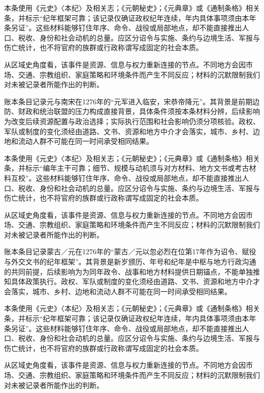 本条使用《元史》〈本纪〉及相关志；《元朝秘史》；《元典章》或《通制条格》相关条，并标示“纪年框架可靠；该记录仅确证政权纪年连续，年内具体事项须由本年条另证”。这些材料能够钉住年序、命令、战役或局部地点，却不能直接推出人口、税收、身份和社会动机的总量。应区分诏令与实施、条约与边境生活、军报与伤亡统计，也不将官府的族群或行政称谓写成固定的社会本质。

从区域史角度看，该事件是资源、信息与权力重新连接的节点。不同地方会因市场、交通、宗教组织、家庭策略和环境条件而产生不同反应；材料的沉默限制我们对未被记录者所能作出的判断。

账本条目记录元与南宋在1276年的“元军进入临安，宋恭帝降元”。其背景是前期边防、财政和统治联盟的压力构成直接背景，具体条件须按本条材料分辨，后续影响为改变后续资源配置与政治选择；实际执行范围和社会影响仍须分项核验。政权、军队或制度的变化须经由道路、文书、资源和地方中介才会落实，城市、乡村、边地和流动人群不可能在同一时间承受相同结果。

本条使用《元史》〈本纪〉及相关志；《元朝秘史》；《元典章》或《通制条格》相关条，并标示“编年主干可靠；细节、规模与动机须与对方材料、地方文书或考古材料互校”。这些材料能够钉住年序、命令、战役或局部地点，却不能直接推出人口、税收、身份和社会动机的总量。应区分诏令与实施、条约与边境生活、军报与伤亡统计，也不将官府的族群或行政称谓写成固定的社会本质。

从区域史角度看，该事件是资源、信息与权力重新连接的节点。不同地方会因市场、交通、宗教组织、家庭策略和环境条件而产生不同反应；材料的沉默限制我们对未被记录者所能作出的判断。

账本条目记录蒙古／元在1276年的“蒙古／元以忽必烈在位第17年作为诏令、赋役与外交文书的纪年框架”。其背景是新岁颁历、年号和纪年是中枢与地方行政沟通的共同前提，后续影响为为同年政令、战事和地方材料提供日期锚点，不能单独推知具体政策执行。政权、军队或制度的变化须经由道路、文书、资源和地方中介才会落实，城市、乡村、边地和流动人群不可能在同一时间承受相同结果。

本条使用《元史》〈本纪〉及相关志；《元朝秘史》；《元典章》或《通制条格》相关条，并标示“纪年框架可靠；该记录仅确证政权纪年连续，年内具体事项须由本年条另证”。这些材料能够钉住年序、命令、战役或局部地点，却不能直接推出人口、税收、身份和社会动机的总量。应区分诏令与实施、条约与边境生活、军报与伤亡统计，也不将官府的族群或行政称谓写成固定的社会本质。

从区域史角度看，该事件是资源、信息与权力重新连接的节点。不同地方会因市场、交通、宗教组织、家庭策略和环境条件而产生不同反应；材料的沉默限制我们对未被记录者所能作出的判断。

